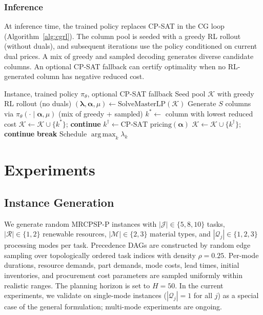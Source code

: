 \documentclass[11pt]{article}
\newcommand{\calK}{\mathcal{K}}
\newcommand{\calJ}{\mathcal{J}}
\newcommand{\calM}{\mathcal{M}}
\newcommand{\calR}{\mathcal{R}}
\newcommand{\calQ}{\mathcal{Q}}
\DeclareMathOperator*{\argmax}{arg\,max}
\begin{document}
\subsubsection{Inference}\label{sec:inference}

At inference time, the trained policy replaces CP-SAT in the CG loop (Algorithm~\ref{alg:cgrl}).
The column pool is seeded with a greedy RL rollout (without duals), and subsequent iterations use the policy conditioned on current dual prices.
A mix of greedy and sampled decoding generates diverse candidate columns.
An optional CP-SAT fallback can certify optimality when no RL-generated column has negative reduced cost.

\begin{algorithm}[t]
\caption{CG + RL Solve}
\label{alg:cgrl}
\begin{algorithmic}[1]
\REQUIRE Instance, trained policy $\pi_\theta$, optional CP-SAT fallback
\STATE Seed pool $\calK$ with greedy RL rollout (no duals)
    \STATE $(\bm{\lambda}, \bm{\alpha}, \mu) \leftarrow \text{SolveMasterLP}(\calK)$
    \STATE Generate $S$ columns via $\pi_\theta(\cdot \mid \bm{\alpha}, \mu)$ (mix of greedy + sampled)
    \STATE $k^* \leftarrow$ column with lowest reduced cost
        \STATE $\calK \leftarrow \calK \cup \{k^*\}$; \textbf{continue}
    \ENDIF
        \STATE $k^{\dagger} \leftarrow \text{CP-SAT pricing}(\bm{\alpha})$
            \STATE $\calK \leftarrow \calK \cup \{k^{\dagger}\}$; \textbf{continue}
        \ENDIF
    \ENDIF
    \STATE \textbf{break} 
\ENDFOR
\RETURN Schedule $\argmax_k \lambda_k$
\end{algorithmic}
\end{algorithm}

\section{Experiments}\label{sec:experiments}

\subsection{Instance Generation}

We generate random MRCPSP-P instances with $|\calJ| \in \{5, 8, 10\}$ tasks, $|\calR| \in \{1, 2\}$ renewable resources, $|\calM| \in \{2, 3\}$ material types, and $|\calQ_j| \in \{1, 2, 3\}$ processing modes per task.
Precedence DAGs are constructed by random edge sampling over topologically ordered task indices with density $\rho = 0.25$.
Per-mode durations, resource demands, part demands, mode costs, lead times, initial inventories, and procurement cost parameters are sampled uniformly within realistic ranges.
The planning horizon is set to $H = 50$.
In the current experiments, we validate on single-mode instances ($|\calQ_j| = 1$ for all $j$) as a special case of the general formulation; multi-mode experiments are ongoing.
\end{document}
